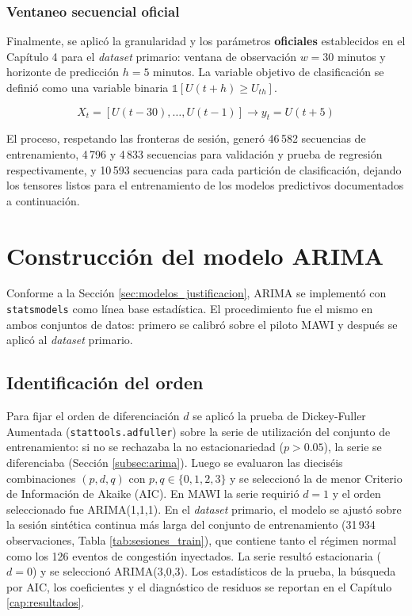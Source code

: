 \documentclass[12pt]{report}
\begin{document}
\subsubsection*{Ventaneo secuencial oficial}

Finalmente, se aplicó la granularidad y los parámetros \textbf{oficiales} establecidos en el Capítulo 4 para el \textit{dataset} primario: ventana de observación $w=30$ minutos y horizonte de predicción $h=5$ minutos. La variable objetivo de clasificación se definió como una variable binaria $\mathbb{1}[U(t+h) \geq U_{th}]$.

\begin{equation}
    X_t = \left[U(t-30), \dots, U(t-1)\right] \longrightarrow y_t = U(t+5)
    \label{eq:ventaneo_instanciada_primario}
\end{equation}

El proceso, respetando las fronteras de sesión, generó 46\,582 secuencias de entrenamiento, 4\,796 y 4\,833 secuencias para validación y prueba de regresión respectivamente, y 10\,593 secuencias para cada partición de clasificación, dejando los tensores listos para el entrenamiento de los modelos predictivos documentados a continuación.

\section{Construcción del modelo ARIMA}
\label{sec:arima_desarrollo}

Conforme a la Sección \ref{sec:modelos_justificacion}, ARIMA se implementó con \texttt{statsmodels} como línea base estadística. El procedimiento fue el mismo en ambos conjuntos de datos: primero se calibró sobre el piloto MAWI y después se aplicó al \textit{dataset} primario.

\subsection*{Identificación del orden}

Para fijar el orden de diferenciación $d$ se aplicó la prueba de Dickey-Fuller Aumentada (\texttt{stattools.adfuller}) sobre la serie de utilización del conjunto de entrenamiento: si no se rechazaba la no estacionariedad ($p>0.05$), la serie se diferenciaba (Sección \ref{subsec:arima}). Luego se evaluaron las dieciséis combinaciones $(p,d,q)$ con $p,q \in \{0,1,2,3\}$ y se seleccionó la de menor Criterio de Información de Akaike (AIC). En MAWI la serie requirió $d=1$ y el orden seleccionado fue ARIMA(1,1,1). En el \textit{dataset} primario, el modelo se ajustó sobre la sesión sintética continua más larga del conjunto de entrenamiento (31\,934 observaciones, Tabla \ref{tab:sesiones_train}), que contiene tanto el régimen normal como los 126 eventos de congestión inyectados. La serie resultó estacionaria ($d=0$) y se seleccionó ARIMA(3,0,3). Los estadísticos de la prueba, la búsqueda por AIC, los coeficientes y el diagnóstico de residuos se reportan en el Capítulo \ref{cap:resultados}.
\end{document}
